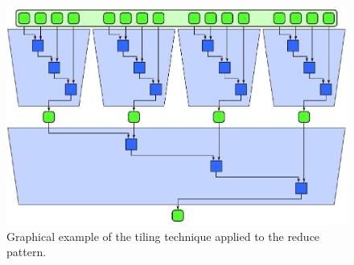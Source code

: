 \newpage

\begin{figure}[!htp]
    \centering
    \includegraphics[width=.9\textwidth]{img/reduce-tiling-pattern-1.pdf}
    \caption{Graphical example of the tiling technique applied to the reduce pattern.}
\end{figure}

